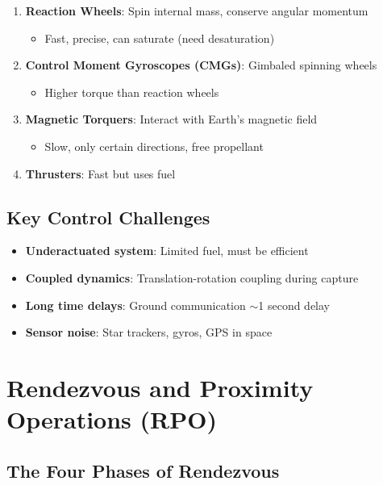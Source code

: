 \documentclass[11pt,a4paper]{article}
\begin{document}
\begin{enumerate}
    \item \textbf{Reaction Wheels}: Spin internal mass, conserve angular momentum
    \begin{itemize}
        \item Fast, precise, can saturate (need desaturation)
    \end{itemize}

    \item \textbf{Control Moment Gyroscopes (CMGs)}: Gimbaled spinning wheels
    \begin{itemize}
        \item Higher torque than reaction wheels
    \end{itemize}

    \item \textbf{Magnetic Torquers}: Interact with Earth's magnetic field
    \begin{itemize}
        \item Slow, only certain directions, free propellant
    \end{itemize}

    \item \textbf{Thrusters}: Fast but uses fuel
\end{enumerate}

\subsection{Key Control Challenges}

\begin{itemize}[leftmargin=*]
    \item \textbf{Underactuated system}: Limited fuel, must be efficient
    \item \textbf{Coupled dynamics}: Translation-rotation coupling during capture
    \item \textbf{Long time delays}: Ground communication $\sim$1 second delay
    \item \textbf{Sensor noise}: Star trackers, gyros, GPS in space
\end{itemize}

\section{Rendezvous and Proximity Operations (RPO)}

\subsection{The Four Phases of Rendezvous}
\end{document}
